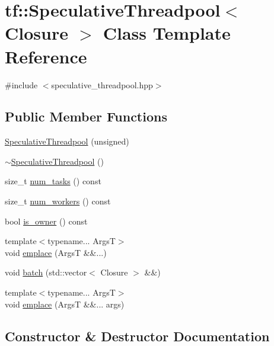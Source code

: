 \hypertarget{classtf_1_1SpeculativeThreadpool}{}\section{tf\+:\+:Speculative\+Threadpool$<$ Closure $>$ Class Template Reference}
\label{classtf_1_1SpeculativeThreadpool}


{\ttfamily \#include $<$speculative\+\_\+threadpool.\+hpp$>$}

\subsection*{Public Member Functions}
\begin{DoxyCompactItemize}
\item 
\hyperlink{classtf_1_1SpeculativeThreadpool_a53e172dd987e309b112c81072d56bf38}{Speculative\+Threadpool} (unsigned)
\item 
\hyperlink{classtf_1_1SpeculativeThreadpool_a416d633cf5fa67c853473a4114fd51e8}{$\sim$\+Speculative\+Threadpool} ()
\item 
size\+\_\+t \hyperlink{classtf_1_1SpeculativeThreadpool_a8ab5c571a1aa8eb5852a5785c611542b}{num\+\_\+tasks} () const
\item 
size\+\_\+t \hyperlink{classtf_1_1SpeculativeThreadpool_afc59dc19c9029bee4a4e4d135737319d}{num\+\_\+workers} () const
\item 
bool \hyperlink{classtf_1_1SpeculativeThreadpool_a0d906451dc641c95550d7a5474595f5c}{is\+\_\+owner} () const
\item 
{\footnotesize template$<$typename... ArgsT$>$ }\\void \hyperlink{classtf_1_1SpeculativeThreadpool_a5eb89fbc72d66fcdc817ce28ff437729}{emplace} (ArgsT \&\&...)
\item 
void \hyperlink{classtf_1_1SpeculativeThreadpool_aaf6fb1ab187875987560b61e5b85f8f2}{batch} (std\+::vector$<$ Closure $>$ \&\&)
\item 
{\footnotesize template$<$typename... ArgsT$>$ }\\void \hyperlink{classtf_1_1SpeculativeThreadpool_a0e412ddb8abc6b315a347348eba08567}{emplace} (ArgsT \&\&... args)
\end{DoxyCompactItemize}


\subsection{Constructor \& Destructor Documentation}
\mbox{\label{classtf_1_1SpeculativeThreadpool_a53e172dd987e309b112c81072d56bf38}} 
